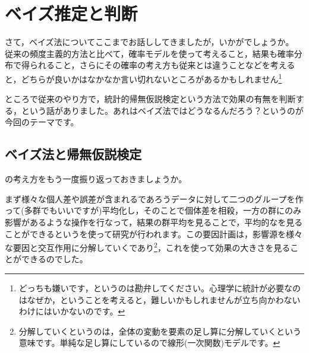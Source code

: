\documentclass{ltjbook}
\begin{document}
\chapter{ベイズ推定と判断}
\label{chapter27}
さて，ベイズ法についてここまでお話ししてきましたが，いかがでしょうか。
従来の頻度主義的方法と比べて，確率モデルを使って考えること，結果も確率分布で得られること，さらにその確率の考え方も従来とは違うことなどを考えると，どちらが良いかはなかなか言い切れないところがあるかもしれません\footnote{どっちも嫌いです，というのは勘弁してください。心理学に統計が必要なのはなぜか，ということを考えると，難しいかもしれませんが立ち向かわないわけにはいかないのです。}

ところで従来のやり方で，統計的帰無仮説検定という方法で効果の有無を判断する，という話がありました。あれはベイズ法ではどうなるんだろう？というのが今回のテーマです。

\section{ベイズ法と帰無仮説検定}
の考え方をもう一度振り返っておきましょうか。

まず様々な個人差や誤差が含まれるであろうデータに対して二つのグループを作って(多群でもいいですが)平均化し，そのことで個体差を相殺，一方の群にのみ影響があるような操作を行なって，結果の群平均を見ることで，平均的なを見ることができるというを使って研究が行われます。この要因計画は，影響源を様々な要因と交互作用に分解していくであり\footnote{分解していくというのは，全体の変動を要素の足し算に分解していくという意味です。単純な足し算にしているので線形(一次関数)モデルです。}，これを使って効果の大きさを見ることができるのでした。
\end{document}
